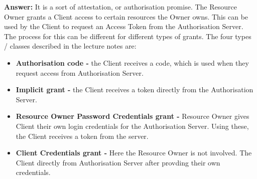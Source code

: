 \documentclass[a4paper]{article}
\newcommand{\A}[1]{ \textbf{Answer:} #1 }
\begin{document}
\A{
    It is a sort of attestation, or authorisation promise. 
    The Resource Owner grants a Client access to certain resources
    the Owner owns. This can be used by the Client to request
    an Access Token from the Authorisation Server.
    The process for this can be different for different types
    of grants. The four types / classes described in the lecture notes are:

    \begin{itemize}
        \item \textbf{Authorisation code - }
            the Client receives a code, which is used
            when they request access from Authorisation Server.
        \item \textbf{Implicit grant - }
            the Client receives a token directly from the Authorisation
            Server.
        \item \textbf{Resource Owner Password Credentials grant - }
            Resource Owner gives Client their own login credentials
            for the Authorisation Server. Using these, the Client 
            receives a token from the server.
        \item \textbf{Client Credentials grant - }
            Here the Resource Owner is not involved. The Client
            directly from Authorisation Server after provding
            their own credentials.
    \end{itemize}

}
\end{document}
